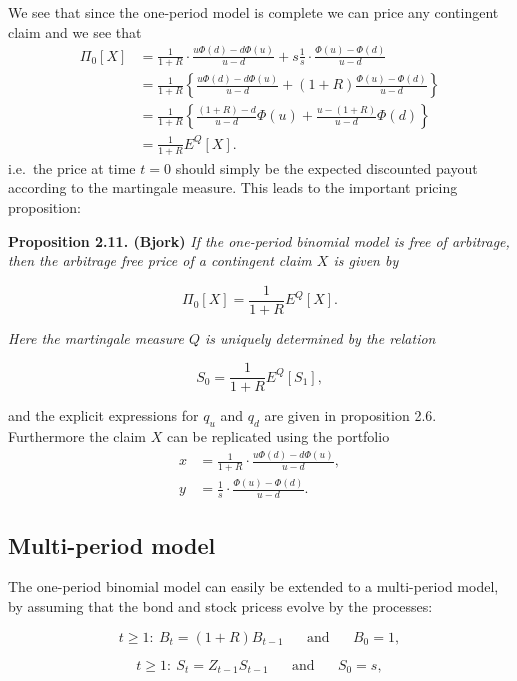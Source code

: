 \documentclass[
]{book}
\begin{document}
We see that since the one-period model is complete we can price any contingent claim and we see that
\begin{align*}
\Pi_0[X]&=\frac{1}{1+R}\cdot\frac{u\Phi(d)-d\Phi(u)}{u-d}+s\frac{1}{s}\cdot\frac{\Phi(u)-\Phi(d)}{u-d}\\
&=\frac{1}{1+R}\left\{\frac{u\Phi(d)-d\Phi(u)}{u-d}+(1+R)\frac{\Phi(u)-\Phi(d)}{u-d}\right\}\\
&=\frac{1}{1+R}\left\{\frac{(1+R)-d}{u-d}\Phi(u)+\frac{u-(1+R)}{u-d}\Phi(d)\right\}\\
&=\frac{1}{1+R}E^Q[X].
\end{align*}
i.e.~the price at time \(t=0\) should simply be the expected discounted payout according to the martingale measure. This leads to the important pricing proposition:

\textbf{Proposition 2.11. (Bjork)} \emph{If the one-period binomial model is free of arbitrage, then the arbitrage free price of a contingent claim \(X\) is given by}

\[
\Pi_0[X]=\frac{1}{1+R}E^Q[X].\tag{2.4}
\]

\emph{Here the martingale measure \(Q\) is uniquely determined by the relation}

\[
S_0=\frac{1}{1+R}E^Q[S_1],\tag{2.5}
\]

and the explicit expressions for \(q_u\) and \(q_d\) are given in proposition 2.6. Furthermore the claim \(X\) can be replicated using the portfolio
\begin{align*}
x&=\frac{1}{1+R}\cdot\frac{u\Phi(d)-d\Phi(u)}{u-d},\tag{2.6}\\
y&=\frac{1}{s}\cdot\frac{\Phi(u)-\Phi(d)}{u-d}.\tag{2.7}
\end{align*}

\newpage

\hypertarget{multi-period-model}{%
\subsection{Multi-period model}\label{multi-period-model}}

The one-period binomial model can easily be extended to a multi-period model, by assuming that the bond and stock pricess evolve by the processes:

\[
t\ge1:\ B_t=(1+R)B_{t-1}\hspace{20pt}\text{and}\hspace{20pt}B_0=1,
\]

\[
t\ge1:\ S_t=Z_{t-1}S_{t-1}\hspace{20pt}\text{and}\hspace{20pt}S_0=s,
\]
\end{document}
